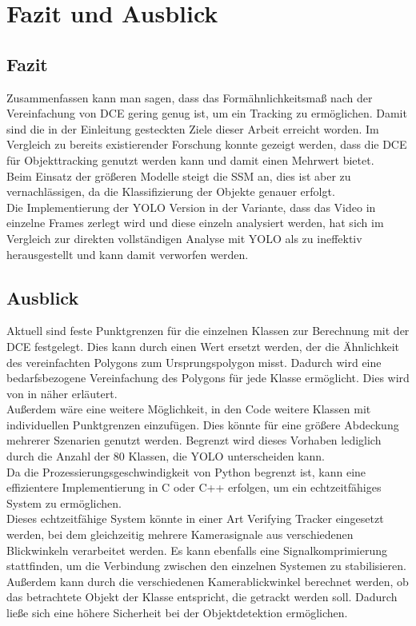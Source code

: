 \chapter{Fazit und Ausblick}
\label{ch:conclusion}
\section{Fazit}
{ 
    Zusammenfassen kann man sagen, dass das Formähnlichkeitsmaß nach der Vereinfachung von DCE gering genug ist, um ein Tracking zu ermöglichen. Damit sind die in der Einleitung gesteckten Ziele dieser Arbeit erreicht worden. Im Vergleich zu bereits existierender Forschung konnte gezeigt werden, dass die DCE für Objekttracking genutzt werden kann und damit einen Mehrwert bietet. \\
	Beim Einsatz der größeren Modelle steigt die SSM an, dies ist aber zu vernachlässigen, da die Klassifizierung der Objekte genauer erfolgt.  \\
	Die Implementierung der YOLO Version in der Variante, dass das Video in einzelne Frames zerlegt wird und diese einzeln analysiert werden, hat sich im Vergleich zur direkten vollständigen Analyse mit YOLO als zu ineffektiv herausgestellt und kann damit verworfen werden.

    }
\section{Ausblick}
{
	Aktuell sind feste Punktgrenzen für die einzelnen Klassen zur Berechnung mit der DCE festgelegt. Dies kann durch einen Wert ersetzt werden, der die Ähnlichkeit des vereinfachten Polygons zum Ursprungspolygon misst. Dadurch wird eine bedarfsbezogene Vereinfachung des Polygons für jede Klasse ermöglicht. Dies wird von \citeauthor{Latecki2003} in  \citep{Latecki2003} näher erläutert. \\
	Außerdem wäre eine weitere Möglichkeit, in den Code weitere Klassen mit individuellen Punktgrenzen einzufügen. Dies könnte für eine größere Abdeckung mehrerer Szenarien genutzt werden. Begrenzt wird dieses Vorhaben lediglich durch die Anzahl der 80 Klassen, die YOLO unterscheiden kann. \\
	Da die Prozessierungsgeschwindigkeit von Python begrenzt ist, kann eine effizientere Implementierung in C oder C++ erfolgen, um ein echtzeitfähiges System zu ermöglichen. \\
	Dieses echtzeitfähige System könnte in einer Art \glqq Verifying Tracker\grqq{} eingesetzt werden, bei dem gleichzeitig mehrere Kamerasignale aus verschiedenen Blickwinkeln verarbeitet werden. Es kann ebenfalls eine Signalkomprimierung stattfinden, um die Verbindung zwischen den einzelnen Systemen zu stabilisieren.  Außerdem kann durch die verschiedenen Kamerablickwinkel berechnet werden, ob das betrachtete Objekt der Klasse entspricht, die getrackt werden soll. Dadurch ließe sich eine höhere Sicherheit bei der Objektdetektion ermöglichen. 

}

